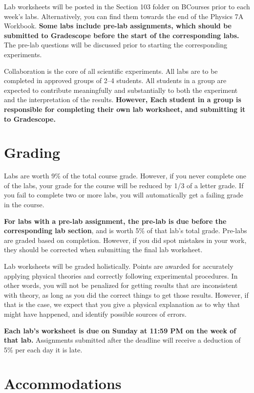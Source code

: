 \documentclass[11pt]{article}
\theoremstyle{gangnamstyle}{\newtheorem{definition}{Definition}[]}
\theoremstyle{gangnamstyle}{\newtheorem{example}{Example}[]}
\theoremstyle{gangnamstyle}{\newtheorem{problem}{Problem}[]}
\theoremstyle{gangnamstyle}{\newtheorem{warning}{Warning}[]}
\begin{document}
Lab worksheets will be posted in the Section 103 folder on BCourses prior to each week's labs. Alternatively, you can find them towards the end of the Physics 7A Workbook. \textbf{Some labs include pre-lab assignments, which should be submitted to Gradescope before the start of the corresponding labs.} The pre-lab questions will be discussed prior to starting the corresponding experiments. 

Collaboration is the core of all scientific experiments. All labs are to be completed in approved groups of 2–4 students. All students in a group are expected to contribute meaningfully and substantially to both the experiment and the interpretation of the results. \textbf{However, Each student in a group is responsible for completing their own lab worksheet, and submitting it to Gradescope.} 

\section*{Grading}

Labs are worth 9\% of the total course grade. However, if you never complete one of the labs, your grade for the course will be reduced by 1/3 of a letter grade. If you fail to complete two or more labs, you will automatically get a failing grade in the course. 

\textbf{For labs with a pre-lab assignment, the pre-lab is due before the corresponding lab section}, and is worth 5\% of that lab's total grade. Pre-labs are graded based on completion. However, if you did spot mistakes in your work, they should be corrected when submitting the final lab worksheet. 

Lab worksheets will be graded holistically. Points are awarded for accurately applying physical theories and correctly following experimental procedures. In other words, you will not be penalized for getting results that are inconsistent with theory, as long as you did the correct things to get those results. However, if that is the case, we expect that you give a physical explanation as to why that might have happened, and identify possible sources of errors. 

\textbf{Each lab's worksheet is due on Sunday at 11:59 PM on the week of that lab.} Assignments submitted after the deadline will receive a deduction of 5\% per each day it is late. 

\section*{Accommodations}
\end{document}

